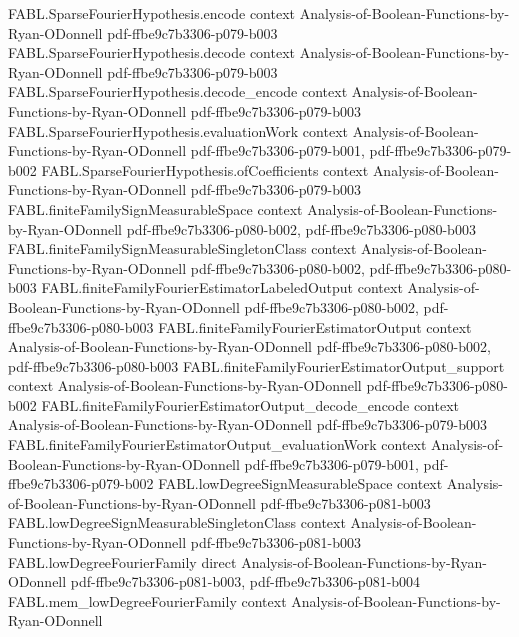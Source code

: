 \begin{theorem}
\proofstep
  {FABL.SparseFourierHypothesis.encode}
  {context}
  {Analysis-of-Boolean-Functions-by-Ryan-ODonnell}
  {pdf-ffbe9c7b3306-p079-b003}
\proofstep
  {FABL.SparseFourierHypothesis.decode}
  {context}
  {Analysis-of-Boolean-Functions-by-Ryan-ODonnell}
  {pdf-ffbe9c7b3306-p079-b003}
\proofstep
  {FABL.SparseFourierHypothesis.decode_encode}
  {context}
  {Analysis-of-Boolean-Functions-by-Ryan-ODonnell}
  {pdf-ffbe9c7b3306-p079-b003}
\proofstep
  {FABL.SparseFourierHypothesis.evaluationWork}
  {context}
  {Analysis-of-Boolean-Functions-by-Ryan-ODonnell}
  {pdf-ffbe9c7b3306-p079-b001,
    pdf-ffbe9c7b3306-p079-b002}
\proofstep
  {FABL.SparseFourierHypothesis.ofCoefficients}
  {context}
  {Analysis-of-Boolean-Functions-by-Ryan-ODonnell}
  {pdf-ffbe9c7b3306-p079-b003}
\proofstep
  {FABL.finiteFamilySignMeasurableSpace}
  {context}
  {Analysis-of-Boolean-Functions-by-Ryan-ODonnell}
  {pdf-ffbe9c7b3306-p080-b002,
    pdf-ffbe9c7b3306-p080-b003}
\proofstep
  {FABL.finiteFamilySignMeasurableSingletonClass}
  {context}
  {Analysis-of-Boolean-Functions-by-Ryan-ODonnell}
  {pdf-ffbe9c7b3306-p080-b002,
    pdf-ffbe9c7b3306-p080-b003}
\proofstep
  {FABL.finiteFamilyFourierEstimatorLabeledOutput}
  {context}
  {Analysis-of-Boolean-Functions-by-Ryan-ODonnell}
  {pdf-ffbe9c7b3306-p080-b002,
    pdf-ffbe9c7b3306-p080-b003}
\proofstep
  {FABL.finiteFamilyFourierEstimatorOutput}
  {context}
  {Analysis-of-Boolean-Functions-by-Ryan-ODonnell}
  {pdf-ffbe9c7b3306-p080-b002,
    pdf-ffbe9c7b3306-p080-b003}
\proofstep
  {FABL.finiteFamilyFourierEstimatorOutput_support}
  {context}
  {Analysis-of-Boolean-Functions-by-Ryan-ODonnell}
  {pdf-ffbe9c7b3306-p080-b002}
\proofstep
  {FABL.finiteFamilyFourierEstimatorOutput_decode_encode}
  {context}
  {Analysis-of-Boolean-Functions-by-Ryan-ODonnell}
  {pdf-ffbe9c7b3306-p079-b003}
\proofstep
  {FABL.finiteFamilyFourierEstimatorOutput_evaluationWork}
  {context}
  {Analysis-of-Boolean-Functions-by-Ryan-ODonnell}
  {pdf-ffbe9c7b3306-p079-b001,
    pdf-ffbe9c7b3306-p079-b002}
\proofstep
  {FABL.lowDegreeSignMeasurableSpace}
  {context}
  {Analysis-of-Boolean-Functions-by-Ryan-ODonnell}
  {pdf-ffbe9c7b3306-p081-b003}
\proofstep
  {FABL.lowDegreeSignMeasurableSingletonClass}
  {context}
  {Analysis-of-Boolean-Functions-by-Ryan-ODonnell}
  {pdf-ffbe9c7b3306-p081-b003}
\proofstep
  {FABL.lowDegreeFourierFamily}
  {direct}
  {Analysis-of-Boolean-Functions-by-Ryan-ODonnell}
  {pdf-ffbe9c7b3306-p081-b003,
    pdf-ffbe9c7b3306-p081-b004}
\proofstep
  {FABL.mem_lowDegreeFourierFamily}
  {context}
  {Analysis-of-Boolean-Functions-by-Ryan-ODonnell}

\end{theorem}
